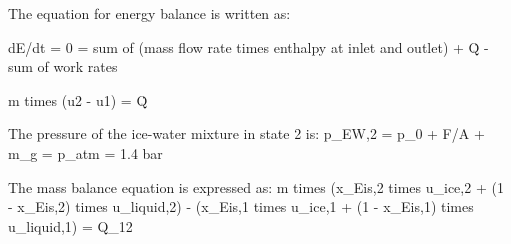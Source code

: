 The equation for energy balance is written as:  

dE/dt = 0 = sum of (mass flow rate times enthalpy at inlet and outlet) + Q̇ - sum of work rates  

m times (u2 - u1) = Q̇  

The pressure of the ice-water mixture in state 2 is:  
p_EW,2 = p_0 + F/A + m_g  
= p_atm  
= 1.4 bar  

The mass balance equation is expressed as:  
m times (x_Eis,2 times u_ice,2 + (1 - x_Eis,2) times u_liquid,2) - (x_Eis,1 times u_ice,1 + (1 - x_Eis,1) times u_liquid,1) = Q_12